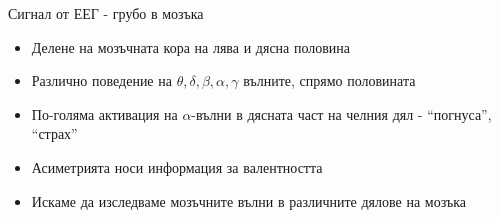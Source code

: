 \documentclass[9pt]{beamer}
\begin{document}
    \begin{frame}[t]{Сигнал от ЕЕГ - грубо в мозъка}
        \begin{itemize}
            \setlength\itemsep{\fill}
            \pause
            \item Делене на мозъчната кора на лява и дясна половина
            \pause
            \item  Различно поведение на $\theta, \delta, \beta, \alpha, \gamma$ вълните, спрямо половината
            \pause
            \item По-голяма активация на $\alpha$-вълни в дясната част на челния дял - ``погнуса'', ``страх''
            \pause
            \item Асиметрията носи информация за валентността
        \end{itemize}
        \pause 
        \begin{itemize}
            \pause
            \item Искаме да изследваме мозъчните вълни в различните дялове на мозъка
        \end{itemize}
    \end{frame}
\end{document}
